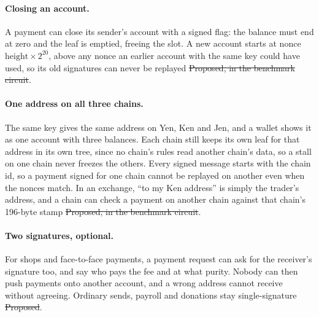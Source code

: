 \paragraph{Closing an account.} A payment can close its sender's account with a signed flag: the balance must end at zero and the leaf is emptied, freeing the slot. A new account starts at nonce $\text{height}\times 2^{20}$, above any nonce an earlier account with the same key could have used, so its old signatures can never be replayed \st{Proposed, in the benchmark circuit}.

\paragraph{One address on all three chains.} The same key gives the same address on Yen, Ken and Jen, and a wallet shows it as one account with three balances. Each chain still keeps its own leaf for that address in its own tree, since no chain's rules read another chain's data, so a stall on one chain never freezes the others. Every signed message starts with the chain id, so a payment signed for one chain cannot be replayed on another even when the nonces match. In an exchange, ``to my Ken address'' is simply the trader's address, and a chain can check a payment on another chain against that chain's 196-byte stamp \st{Proposed, in the benchmark circuit}.

\paragraph{Two signatures, optional.} For shops and face-to-face payments, a payment request can ask for the receiver's signature too, and say who pays the fee and at what purity. Nobody can then push payments onto another account, and a wrong address cannot receive without agreeing. Ordinary sends, payroll and donations stay single-signature \st{Proposed}.
